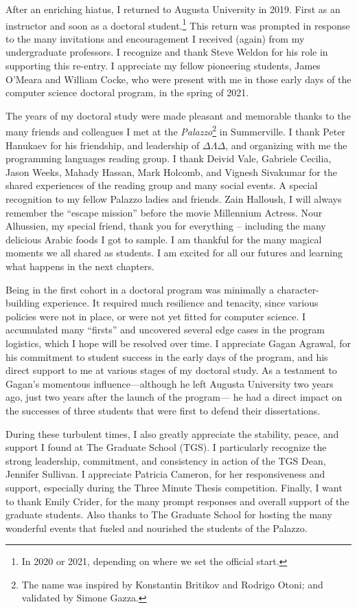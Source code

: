 After an enriching hiatus, I returned to Augusta University in 2019.
First as an instructor and soon as a doctoral student.\footnote{In 2020 or 2021, depending on where we set the official start.}
This return was prompted in response to the many invitations and encouragement I received (again) from my undergraduate professors.
I recognize and thank Steve Weldon for his role in supporting this re-entry.
I appreciate my fellow pioneering students, James O'Meara and William Cocke, who were present with me in those early days of the computer science doctoral program, in the spring of 2021.

The years of my doctoral study were made pleasant and memorable thanks to the many friends and colleagues I met at the \emph{Palazzo}\footnote{The name was inspired by Konstantin Britikov and Rodrigo Otoni; and validated by Simone Gazza.} in Summerville.
I thank Peter Hanukaev for his friendship, and leadership of $\Delta\Lambda\Delta$, and organizing with me the programming languages reading group.
I thank Deivid Vale, Gabriele Cecilia, Jason Weeks, Mahady Hassan, Mark Holcomb, and Vignesh Sivakumar for the shared experiences of the reading group and many social events.
A special recognition to my fellow Palazzo ladies and friends.
Zain Halloush, I will always remember the \enquote{escape mission} before the movie Millennium Actress.
Nour Alhussien, my special friend, thank you for everything -- including the many delicious Arabic foods I got to sample.
I am thankful for the many magical moments we all shared as students.
I am excited for all our futures and learning what happens in the next chapters.

Being in the first cohort in a doctoral program was minimally a character-building experience.
It required much resilience and tenacity, since various policies were not in place, or were not yet fitted for computer science.
I accumulated many \enquote{firsts} and uncovered several edge cases in the program logistics, which I hope will be resolved over time.
I appreciate Gagan Agrawal, for his commitment to student success in the early days of the program, and his direct support to me at various stages of my doctoral study.
As a testament to Gagan's momentous influence---although he left Augusta University two years ago, just two years after the launch of the program---%
he had a direct impact on the successes of three students that were first to defend their dissertations.

During these turbulent times, I also greatly appreciate the stability, peace, and support I found at The Graduate School (TGS).
I particularly recognize the strong leadership, commitment, and consistency in action of the TGS Dean, Jennifer Sullivan.
I appreciate Patricia Cameron, for her responsiveness and support, especially during the Three Minute Thesis competition.
Finally, I want to thank Emily Crider, for the many prompt responses and overall support of the graduate students.
Also thanks to The Graduate School for hosting the many wonderful events that fueled and nourished the students of the Palazzo.

